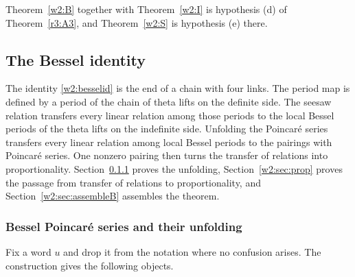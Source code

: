 Theorem~\ref{w2:B} together with Theorem~\ref{w2:I} is hypothesis (d) of Theorem~\ref{r3:A3}, and Theorem~\ref{w2:S} is hypothesis (e) there. 

\subsection{The Bessel identity}\label{w2:sec:bessel}

The identity \eqref{w2:besselid} is the end of a chain with four links. The period map is defined by a period of the chain of theta lifts on the definite side. The seesaw relation transfers every linear relation among those periods to the local Bessel periods of the theta lifts on the indefinite side. Unfolding the Poincar\'e series transfers every linear relation among local Bessel periods to the pairings with Poincar\'e series. One nonzero pairing then turns the transfer of relations into proportionality. Section~\ref{w2:sec:unfold} proves the unfolding, Section~\ref{w2:sec:prop} proves the passage from transfer of relations to proportionality, and Section~\ref{w2:sec:assembleB} assembles the theorem.

\subsubsection{Bessel Poincar\'e series and their unfolding}\label{w2:sec:unfold}

Fix a word $u$ and drop it from the notation where no confusion arises. The construction gives the following objects.

